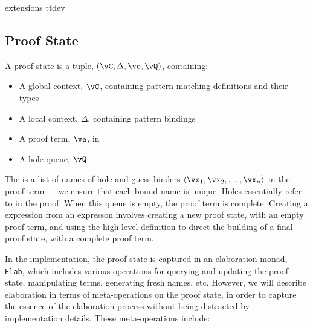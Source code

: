 {\TTdev{} extensions}
{ttdev}


\subsection{Proof State}

A proof state is a tuple, $(\vC, \Delta, \ve, \vQ)$, containing:

\begin{itemize}
\item A global context, $\vC$, containing pattern matching definitions and their types
\item A local context, $\Delta$, containing pattern bindings
\item A proof term, $\ve$, in \TTdev{}
\item A hole queue, $\vQ$
\end{itemize}

The  is a list of names of hole and guess binders 
$\langle\vx_1,\vx_2,\ldots,\vx_n\rangle$
in the proof term ---
we ensure that each bound name is unique. Holes essentially refer to 
in the proof.
When this queue is empty, the proof term is complete.
Creating a \TT{} expression from an \Idris{} expresson involves creating
a new proof state, with an empty proof term, and using the high level definition
to direct the building of a final proof state, with a complete proof term.

In the implementation, the proof state is captured in an elaboration monad,
\texttt{Elab}, which includes various operations for querying and updating
the proof state, manipulating terms, generating fresh names, etc. However, we will
describe \Idris{} elaboration in terms of meta-operations on the proof state,
in order to capture the essence of the elaboration process without being distracted
by implementation details. These meta-operations include: 

